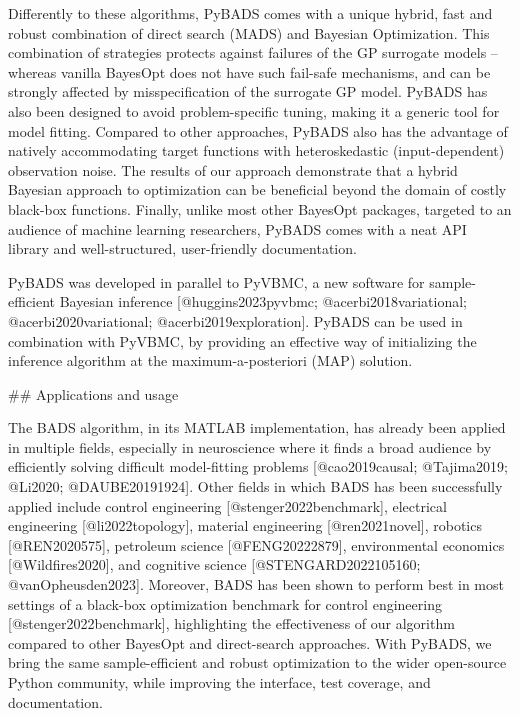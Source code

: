 \documentclass{article}
\begin{document}
\begin{markdown}
Differently to these algorithms, PyBADS comes with a unique hybrid, fast and robust combination of direct search (MADS) and Bayesian Optimization. This combination of strategies protects against failures of the GP surrogate models – whereas vanilla BayesOpt does not have such fail-safe mechanisms, and can be strongly affected by misspecification of the surrogate GP model. PyBADS has also been designed to avoid problem-specific tuning, making it a generic tool for model fitting. Compared to other approaches, PyBADS also has the advantage of natively accommodating  target functions with heteroskedastic (input-dependent) observation noise. The results of our approach demonstrate that a hybrid Bayesian approach to optimization can be beneficial beyond the domain of costly black-box functions.
Finally, unlike most other BayesOpt packages, targeted to an audience of machine learning researchers, PyBADS comes with a neat API library and well-structured, user-friendly documentation.

PyBADS was developed in parallel to PyVBMC, a new software for sample-efficient Bayesian inference [@huggins2023pyvbmc; @acerbi2018variational; @acerbi2020variational; @acerbi2019exploration]. PyBADS can be used in combination with PyVBMC, by providing an effective way of initializing the inference algorithm at the maximum-a-posteriori (MAP) solution.

## Applications and usage

The BADS algorithm, in its MATLAB implementation, has already been applied in multiple fields, especially in neuroscience where it finds a broad audience by efficiently solving difficult model-fitting problems [@cao2019causal; @Tajima2019; @Li2020; @DAUBE20191924]. Other fields in which BADS has been successfully applied include control engineering [@stenger2022benchmark], electrical engineering [@li2022topology], material engineering [@ren2021novel], robotics [@REN2020575], petroleum science [@FENG20222879], environmental economics [@Wildfires2020], and cognitive science [@STENGARD2022105160; @vanOpheusden2023]. Moreover, BADS has been shown to perform best in most settings of a black-box optimization benchmark for control engineering [@stenger2022benchmark], highlighting the effectiveness of our algorithm compared to other BayesOpt and direct-search approaches.
With PyBADS, we bring the same sample-efficient and robust optimization to the wider open-source Python community, while improving the interface, test coverage, and documentation.


\end{markdown}
\end{document}
